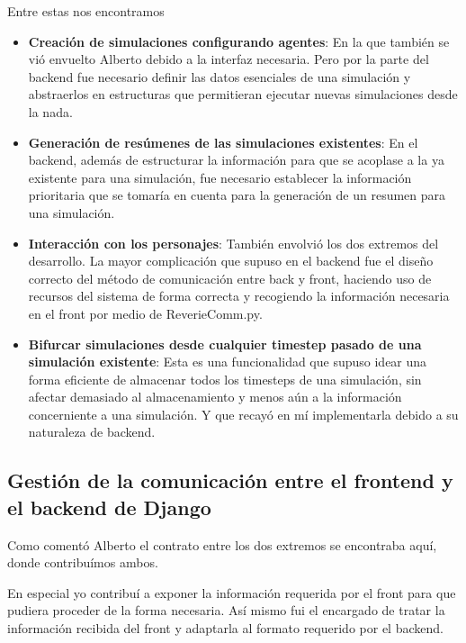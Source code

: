 Entre estas nos encontramos 
\begin{itemize}
    \item \textbf{Creación de simulaciones configurando agentes}: En la que también se vió envuelto Alberto debido a la interfaz necesaria. Pero por la parte del backend fue necesario definir las datos esenciales de una simulación y abstraerlos en estructuras que permitieran ejecutar nuevas simulaciones desde la nada.

    \item \textbf{Generación de resúmenes de las simulaciones existentes}: En el backend, además de estructurar la información para que se acoplase a la ya existente para una simulación, fue necesario establecer la información prioritaria que se tomaría en cuenta para la generación de un resumen para una simulación.

    \item \textbf{Interacción con los personajes}: También envolvió los dos extremos del desarrollo. La mayor complicación que supuso en el backend fue el diseño correcto del método de comunicación entre back y front, haciendo uso de recursos del sistema de forma correcta y recogiendo la información necesaria en el front por medio de ReverieComm.py.

    \item \textbf{Bifurcar simulaciones desde cualquier timestep pasado de una simulación existente}: Esta es una funcionalidad que supuso idear una forma eficiente de almacenar todos los timesteps de una simulación, sin afectar demasiado al almacenamiento y menos aún a la información concerniente a una simulación. Y que recayó en mí implementarla debido a su naturaleza de backend.

\end{itemize}

\subsection*{Gestión de la comunicación entre el frontend y el backend de Django}

Como comentó Alberto el contrato entre los dos extremos se encontraba aquí, donde contribuímos ambos.

En especial yo contribuí a exponer la información requerida por el front para que pudiera proceder de la forma necesaria. Así mismo fui el encargado de tratar la información recibida del front y adaptarla al formato requerido por el backend.